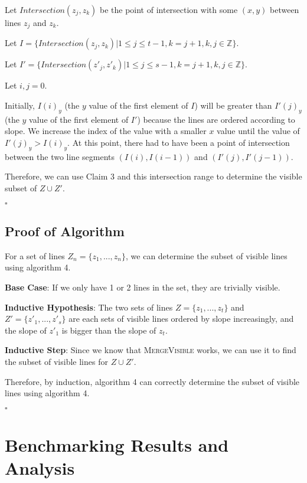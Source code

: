 \documentclass[12pt,letterpaper]{article}
\begin{document}
Let $Intersection(z_j, z_k)$ be the point of intersection with some $(x, y)$ between lines $z_j$ and $z_k$. 

Let $I  = \{ Intersection(z_j, z_k) | 1 \leq j \leq t - 1, k = j + 1, k, j \in \mathbb{Z} \}$.

Let $I' = \{ Intersection(z'_j, z'_k) | 1 \leq j \leq s - 1, k = j + 1, k, j \in \mathbb{Z}  \}$.

Let $i,j = 0$.

Initially, $I(i)_y$ (the $y$ value of the first element of $I$) will be greater than $I'(j)_y$ (the $y$ value of the first element of $I'$) because the lines are ordered according to slope. We increase the index of the value with a smaller $x$ value until the value of $I'(j)_y > I(i)_y$. At this point, there had to have been a point of intersection between the two line segments $(I(i), I(i-1))$ and $(I'(j), I'(j-1))$. 

Therefore, we can use Claim 3 and this intersection range to determine the visible subset of $Z \cup Z'$.

$\square$

\subsection{Proof of Algorithm}

For a set of lines $Z_n = \{ z_1, ..., z_n \}$, we can determine the subset of visible lines using algorithm 4.

\textbf{Base Case}: If we only have 1 or 2 lines in the set, they are trivially visible.

\textbf{Inductive Hypothesis}: The two sets of lines $Z = \{ z_1, ..., z_t \}$ and $ Z' = \{ z'_1, ..., z'_s \}$ are each sets of visible lines ordered by slope increasingly, and the slope of $z'_1$ is bigger than the slope of $z_t$.

\textbf{Inductive Step}: Since we know that \textsc{MergeVisible} works, we can use it to find the subset of visible lines for $Z \cup Z'$.

Therefore, by induction, algorithm 4 can correctly determine the subset of visible lines using algorithm 4.

$\square$

\section{Benchmarking Results and Analysis}
\end{document}
